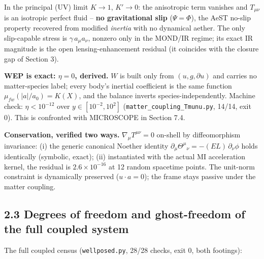 \documentclass[
]{article}
\begin{document}
In the principal (UV) limit \(K \to 1\), \(K' \to 0\): the anisotropic
term vanishes and \(T_{\mu\nu}\) is an isotropic perfect fluid --
\textbf{no gravitational slip} (\(\Psi = \Phi\)), the AeST no-slip
property recovered from modified \emph{inertia} with no dynamical
aether. The only slip-capable stress is \(\gamma\, a_\mu a_\nu\),
nonzero only in the MOND/IR regime; its exact IR magnitude is the open
lensing-enhancement residual (it coincides with the closure gap of
Section 3).

\textbf{WEP is exact: \(\eta = 0\), derived.} \(W\) is built only from
\((u, g, \partial u)\) and carries no matter-species label; every body's
inertial coefficient is the same function \(\mu_{fw}(|a|/a_0) = K(X)\),
and the balance inverts species-independently. Machine check:
\(\eta < 10^{-12}\) over \(y \in [10^{-2}, 10^2]\)
(\texttt{matter\_coupling\_Tmunu.py}, 14/14, exit 0). This is confronted
with MICROSCOPE in Section 7.4.

\textbf{Conservation, verified two ways.} \(\nabla_\mu T^{\mu\nu} = 0\)
on-shell by diffeomorphism invariance: (i) the generic canonical Noether
identity \(\partial_\mu \Theta^\mu{}_\nu = -(EL)\,\partial_\nu\phi\)
holds identically (symbolic, exact); (ii) instantiated with the actual
MI acceleration kernel, the residual is \(2.6 \times 10^{-16}\) at 12
random spacetime points. The unit-norm constraint is dynamically
preserved (\(u \cdot a = 0\)); the frame stays passive under the matter
coupling.

\subsection{2.3 Degrees of freedom and ghost-freedom of the full coupled
system}\label{degrees-of-freedom-and-ghost-freedom-of-the-full-coupled-system}

The full coupled census (\texttt{wellposed.py}, 28/28 checks, exit 0,
both footings):
\end{document}
